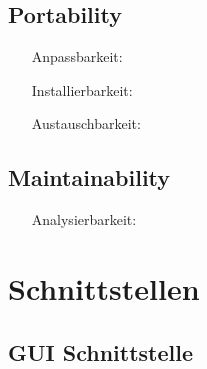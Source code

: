 \subsection{Portability}
\begin{itemize}
	\item[Anpassbarkeit:] 
	\item[Installierbarkeit:] 
	\item[Austauschbarkeit:]
\end{itemize}

\subsection{Maintainability}
\begin{itemize}
	\item[Analysierbarkeit:] 
\end{itemize}

\section{Schnittstellen}


\subsection{GUI Schnittstelle}
